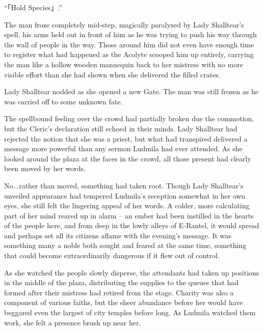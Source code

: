 

“「Hold Species」.”

 

The man froze completely mid-step, magically paralyzed by Lady Shalltear’s spell, his arms held out in front of him as he was trying to push his way through the wall of people in the way. Those around him did not even have enough time to register what had happened as the Acolyte scooped him up entirely, carrying the man like a hollow wooden mannequin back to her mistress with no more visible effort than she had shown when she delivered the filled crates.

 

Lady Shalltear nodded as she opened a new Gate. The man was still frozen as he was carried off to some unknown fate.

 

The spellbound feeling over the crowd had partially broken due the commotion, but the Cleric’s declaration still echoed in their minds. Lady Shalltear had rejected the notion that she was a priest, but what had transpired delivered a message more powerful than any sermon Ludmila had ever attended. As she looked around the plaza at the faces in the crowd, all those present had clearly been moved by her words.

 

No...rather than moved, something had taken root. Though Lady Shalltear’s unveiled appearance had tempered Ludmila’s reception somewhat in her own eyes, she still felt the lingering appeal of her words. A colder, more calculating part of her mind reared up in alarm – an ember had been instilled in the hearts of the people here, and from deep in the lowly alleys of E-Rantel, it would spread and perhaps set all its citizens aflame with the evening’s message. It was something many a noble both sought and feared at the same time, something that could become extraordinarily dangerous if it flew out of control.

 

As she watched the people slowly disperse, the attendants had taken up positions in the middle of the plaza, distributing the supplies to the queues that had formed after their mistress had retired from the stage. Charity was also a component of various faiths, but the sheer abundance before her would have beggared even the largest of city temples before long. As Ludmila watched them work, she felt a presence brush up near her.

 

